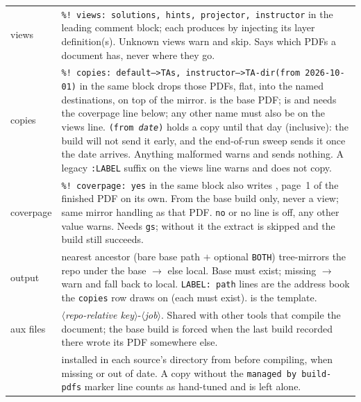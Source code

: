 \begin{center}
\begin{tabularx}{\linewidth}{@{}l Y@{}}
views & \texttt{\%!\ views: solutions, hints, projector, instructor} in
  the leading comment block; each produces  by
  injecting its layer definition(s). Unknown views warn and skip. Says
  which PDFs a document has, never where they go.\\
copies & \texttt{\%!\ copies: default-->TAs, instructor-->TA-dir(from
  2026-10-01)} in the same block drops those PDFs, flat, into the named
   destinations, on top of the mirror.  is
  the base PDF;  is  and needs
  the coverpage line below; any other name must also be on the views line.
  \texttt{(from \emph{date})} holds a copy until that day (inclusive):
  the build will not send it early, and the end-of-run sweep sends it
  once the date arrives. Anything malformed warns and sends nothing. A
  legacy \texttt{:LABEL} suffix on the views line warns and does not
  copy.\\
coverpage & \texttt{\%!\ coverpage: yes} in the same block also writes
  , page~1 of the finished PDF on its own. From
  the base build only, never a view; same mirror handling as that PDF.
  \texttt{no} or no line is off, any other value warns. Needs
  \texttt{gs}; without it the extract is skipped and the build still
  succeeds.\\
output & nearest ancestor  (bare base path $+$ optional
  \texttt{BOTH}) tree-mirrors the repo under the base $\to$ else local.
  Base must exist; missing $\to$ warn and fall back to local.
  \texttt{LABEL: path} lines are the address book the \texttt{copies} row
  draws on (each must exist).  is the template.\\
aux files & $\langle$\emph{repo-relative
  key}$\rangle$-$\langle$\emph{job}$\rangle$.
  Shared with other tools that compile the document; the base build is forced when the last build recorded there wrote its PDF somewhere else.\\
 & installed in each source's directory from
   before compiling, when missing or out of date.
  A copy without the \texttt{managed by build-pdfs} marker line counts as
  hand-tuned and is left alone.\\
\end{tabularx}
\end{center}


